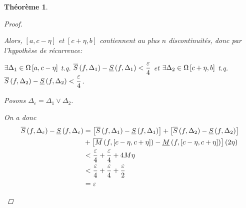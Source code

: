 \documentclass{report}
\newcommand*{\raffinement}[2]{#1 \vee #2}
\newcommand*{\eps}{\varepsilon}
\newtheorem*{thm}{Th\'eor\`eme}
\theoremstyle{definition}
\theoremstyle{remark}
\begin{document}
\begin{thm}
\begin{proof}
\begin{enumerate}
				Alors, $[a,c-\eta]$ et $[c+\eta,b]$ contiennent au plus $n$ discontinuit\'es, donc par l'hypoth\`ese de r\'ecurrence:

				$\exists\Delta_1\in \partitions[a,c-\eta]$ t.q.  $\ssup{f}[\Delta_1] - \sinf{f}[\Delta_1] < \dfrac{\eps}{4}$ et $\exists\Delta_2\in \partitions[c+\eta,b]$ t.q.  $\ssup{f}[\Delta_2] - \sinf{f}[\Delta_2] < \dfrac{\eps}{4}$.

				Posons $\Delta_\eps = \raffinement{\Delta_1}{\Delta_2}$.

				On a donc
				\begin{align*}
					\ssup{f}[\Delta_\eps] - \sinf{f}[\Delta_\eps] &= \left[ \ssup{f}[\Delta_1] - \sinf{f}[\Delta_1] \right] + \left[ \ssup{f}[\Delta_2] - \sinf{f}[\Delta_2] \right]\\
					&+ \left[ \msup{f}[c-\eta,c+\eta] - \minf{f}[c-\eta,c+\eta] \right] \left( 2\eta \right)\\
					&< \dfrac{\eps}{4} + \dfrac{\eps}{4} + 4M\eta\\
					&< \dfrac{\eps}{4} + \dfrac{\eps}{4} + \dfrac{\eps}{2}\\
					&= \eps
				\end{align*}
			\end{enumerate}
		\end{proof}
	\end{thm}
\end{document}
